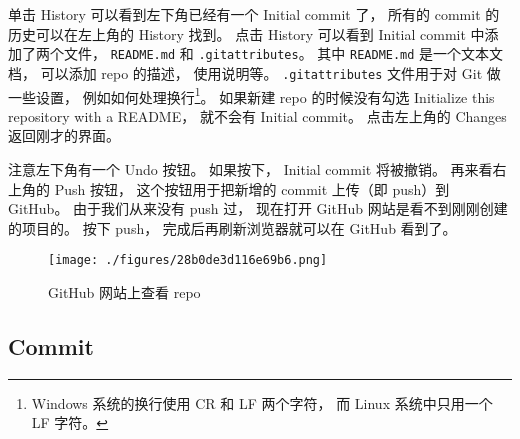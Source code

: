 单击 History 可以看到左下角已经有一个 Initial commit 了， 所有的 commit 的历史可以在左上角的 History 找到。 点击 History 可以看到 Initial commit 中添加了两个文件， \verb|README.md| 和 \verb|.gitattributes|。 其中 \verb|README.md| 是一个文本文档， 可以添加 repo 的描述， 使用说明等。 \verb|.gitattributes| 文件用于对 Git 做一些设置， 例如如何处理换行\footnote{Windows 系统的换行使用 CR 和 LF 两个字符， 而 Linux 系统中只用一个 LF 字符。}。 如果新建 repo 的时候没有勾选 Initialize this repository with a README， 就不会有 Initial commit。 点击左上角的 Changes 返回刚才的界面。

注意左下角有一个 Undo 按钮。 如果按下， Initial commit 将被撤销。 再来看右上角的 Push 按钮， 这个按钮用于把新增的 commit 上传（即 push）到 GitHub。 由于我们从来没有 push 过， 现在打开 GitHub 网站是看不到刚刚创建的项目的。 按下 push， 完成后再刷新浏览器就可以在 GitHub 看到了。
\begin{figure}[ht]
\centering
\texttt{[image: ./figures/28b0de3d116e69b6.png]}
\caption{GitHub 网站上查看 repo} \label{fig_GitHub_5}
\end{figure}

\subsection{Commit}
